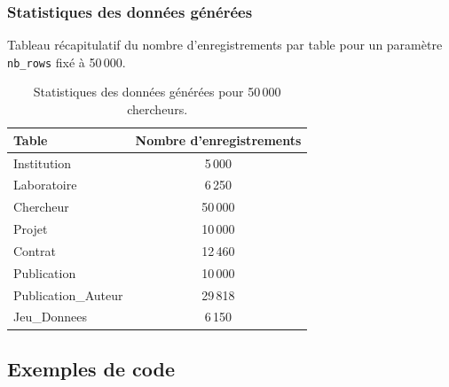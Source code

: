 \documentclass[12pt,a4paper]{article}
\begin{document}
\subsubsection{Statistiques des données générées}
Tableau récapitulatif du nombre d'enregistrements par table pour un paramètre \texttt{nb\_rows} fixé à 50\,000.

\begin{table}[H]
\centering
\begin{tabular}{@{}lc@{}}
\toprule
\textbf{Table} & \textbf{Nombre d'enregistrements} \\ \midrule
Institution & 5\,000 \\
Laboratoire & 6\,250 \\
Chercheur & 50\,000 \\
Projet & 10\,000 \\
Contrat & 12\,460 \\
Publication & 10\,000 \\
Publication\_Auteur & 29\,818 \\
Jeu\_Donnees & 6\,150 \\ \bottomrule
\end{tabular}
\caption{Statistiques des données générées pour 50\,000 chercheurs.}
\label{tab:stats}
\end{table}

\subsection{Exemples de code}
\end{document}
